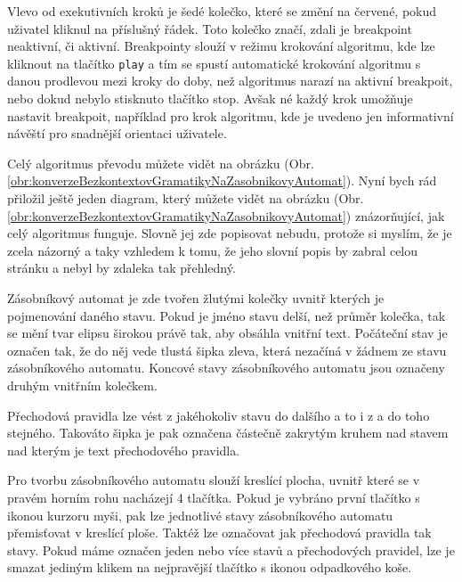 Vlevo od exekutivních kroků je šedé kolečko, které se změní na červené, pokud uživatel kliknul na příslušný řádek. Toto kolečko značí, zdali je breakpoint neaktivní, či aktivní. Breakpointy slouží v režimu krokování algoritmu, kde lze kliknout na tlačítko \texttt{play} a tím se spustí automatické krokování algoritmu s danou prodlevou mezi kroky do doby, než algoritmus narazí na aktivní breakpoit, nebo dokud nebylo stisknuto tlačítko stop. Avšak né každý krok umožňuje nastavit breakpoit, například pro krok algoritmu, kde je uvedeno jen informativní návěští pro snadnější orientaci uživatele. 

Celý algoritmus převodu můžete vidět na obrázku (Obr. \ref{obr:konverzeBezkontextovGramatikyNaZasobnikovyAutomat}). Nyní bych rád přiložil ještě jeden diagram, který můžete vidět na obrázku (Obr. \ref{obr:konverzeBezkontextovGramatikyNaZasobnikovyAutomat}) znázorňující, jak celý algoritmus funguje. Slovně jej zde popisovat nebudu, protože si myslím, že je zcela názorný a taky vzhledem k tomu, že jeho slovní popis by zabral celou stránku a nebyl by zdaleka tak přehledný.



Zásobníkový automat je zde tvořen žlutými kolečky uvnitř kterých je pojmenování daného stavu. Pokud je jméno stavu delší, než průměr kolečka, tak se mění tvar elipsu širokou právě tak, aby obsáhla vnitřní text. Počáteční stav je označen tak, že do něj vede tlustá šipka zleva, která nezačíná v žádnem ze stavu zásobníkového automatu. Koncové stavy zásobníkového automatu jsou označeny druhým vnitřním kolečkem.

Přechodová pravidla lze vést z jakéhokoliv stavu do dalšího a to i z a do toho stejného. Takováto šipka je pak označena částečně zakrytým kruhem nad stavem nad kterým je text přechodového pravidla. 

Pro tvorbu zásobníkového automatu slouží kreslící plocha, uvnitř které se v pravém horním rohu nacházejí 4 tlačítka. Pokud je vybráno první tlačítko s ikonou kurzoru myši, pak lze jednotlivé stavy zásobníkového automatu přemisťovat v kreslící ploše. Taktéž lze označovat jak přechodová pravidla tak stavy. Pokud máme označen jeden nebo více stavů a přechodových pravidel, lze je smazat jediným klikem na nejpravější tlačítko s ikonou odpadkového koše.

